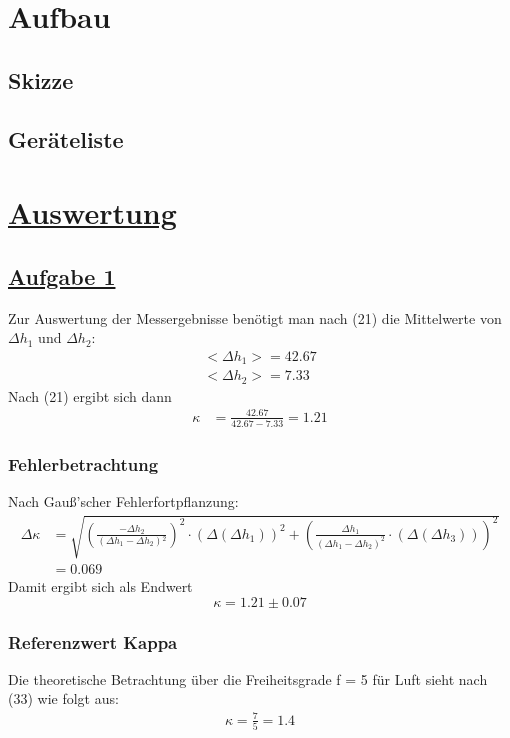 \documentclass[11pt,a4paper]{article}
\begin{document}
  \section{Aufbau}
  \subsection{Skizze}
  \subsection{Ger\"ateliste}
  \section{\underline{Auswertung}}
\subsection{\underline{Aufgabe 1}}
Zur Auswertung der Messergebnisse benötigt man nach (21) die Mittelwerte von $\Delta h_{1} $ und $\Delta h_{2}$:
\begin{align}
  <\Delta h_{1}> = 42.67 \\
  <\Delta h_{2}> = 7.33
\end{align}
Nach (21) ergibt sich dann
\begin{align}
  \kappa &= \frac{42.67}{42.67-7.33} = 1.21
\end{align}
\subsubsection{Fehlerbetrachtung}
Nach Gauß'scher Fehlerfortpflanzung:
\begin{align}
    \Delta \kappa &= \sqrt{{\left(\frac{- \Delta h_{2}}{{(\Delta h_{1}-\Delta
    h_{2})}{^2}}\right)}^{2} \cdot {(\Delta(\Delta h_{1}))}^{2}+{\left(\frac{\Delta
    h_{1}}{{(\Delta h_{1} - \Delta h_{2})}^{2}}\cdot (\Delta(\Delta h_{3}))\right)}^{2}}\\
&= 0.069
\end{align}
Damit ergibt sich als Endwert
\begin{equation}
  \kappa = 1.21 \pm 0.07
\end{equation}

\subsubsection{Referenzwert Kappa}
Die theoretische Betrachtung über die Freiheitsgrade f = 5 für Luft sieht nach
(33) wie folgt aus:
\begin{align}
    \kappa = \frac{7}{5} = 1.4
\end{align}
\end{document}
